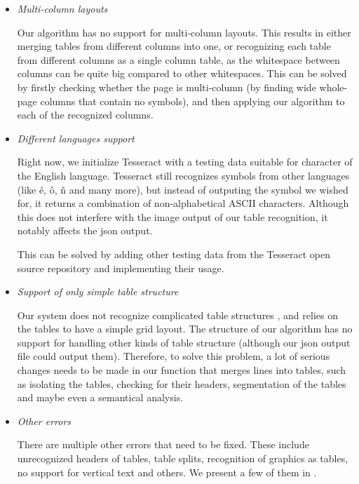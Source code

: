\begin{itemize}
    \item \emph{Multi-column layouts}
    
    Our algorithm has no support for multi-column layouts. This results in either merging tables from different columns into one, or recognizing each table from different columns as a single column table, as the whitespace between columns can be quite big compared to other whitespaces. This can be solved by firstly checking whether the page is multi-column (by finding wide whole-page columns that contain no symbols), and then applying our algorithm to each of the recognized columns.
    
    \item \emph{Different languages support}
    
    Right now, we initialize Tesseract with a testing data suitable for character of the English language. Tesseract still recognizes symbols from other languages (like é, ô, ñ and many more), but instead of outputing the symbol we wished for, it returns a combination of non-alphabetical ASCII characters. Although this does not interfere with the image output of our table recognition, it notably affects the json output.
    
    This can be solved by adding other testing data from the Tesseract open source repository and implementing their usage.
    
    \item \emph{Support of only simple table structure}
    
    Our system does not recognize complicated table structures , and relies on the tables to have a simple grid layout. The structure of our algorithm has no support for handling other kinds of table structure (although our json output file could output them). Therefore, to solve this problem, a lot of serious changes needs to be made in our function that merges lines into tables, such as isolating the tables, checking for their headers, segmentation of the tables and maybe even a semantical analysis.  
    
    \item \emph{Other errors}
    
    There are multiple other errors that need to be fixed. These include unrecognized headers of tables, table splits, recognition of graphics as tables, no support for vertical text and others. We present a few of them in .
    
\end{itemize}


